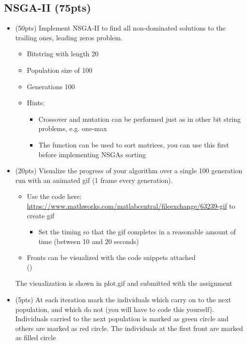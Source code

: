 \documentclass{article}
\begin{document}
\subsection{NSGA-II (75pts)}
\begin{itemize}
	\item (50pts) Implement NSGA-II to find all non-dominated solutions to the trailing ones, leading zeros problem. 
	\begin{itemize}
		\item Bitstring with length 20
		\item Population size of 100
		\item Generations 100
		\item Hints:
		\begin{itemize}
			\item Crossover and mutation can be performed just as in other bit string problems, e.g. one-max
			\item The  function can be used to sort matrices, you can use this first before implementing NSGAs sorting
		\end{itemize}
	\end{itemize}
	\item (20pts) Visualize the progress of your algorithm over a single 100 generation run with an animated gif (1 frame every generation).
	\begin{itemize}
		\item Use the code here: \url{https://www.mathworks.com/matlabcentral/fileexchange/63239-gif} to create gif
		\begin{itemize}
			\item Set the timing so that the gif completes in a reasonable amount of time (between 10 and 20 seconds)
		\end{itemize}
		\item Fronts can be visualized with the code snippets attached\\ ()
	\end{itemize}
	{\color{blue} The visualization is shown in plot.gif and submitted with the assignment}
	\item (5pts) At each iteration mark the individuals which carry on to the next population, and which do not (you will have to code this yourself).\\
	{\color{blue} Individuals carried to the next population is marked as green circle and others are marked as red circle. The individuals at the first front are marked as filled circle}
\end{itemize}
\end{document}
